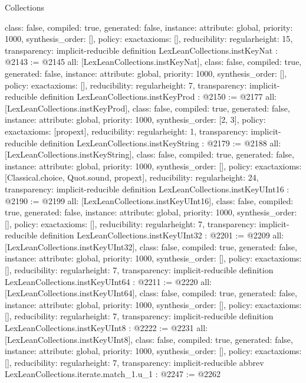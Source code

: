 \begin{lexlean}{Collections}
\begin{coremodule}
{  class: false,
  compiled: true,
  generated: false,
  instance: {attribute: global, priority: 1000, synthesis_order: []},
  policy: exact{axioms: []},
  reducibility: regular{height: 15},
  transparency: implicit-reducible
}
definition LexLeanCollections.instKeyNat : @2143 := @2145 {
  all: [LexLeanCollections.instKeyNat],
  class: false,
  compiled: true,
  generated: false,
  instance: {attribute: global, priority: 1000, synthesis_order: []},
  policy: exact{axioms: []},
  reducibility: regular{height: 7},
  transparency: implicit-reducible
}
definition LexLeanCollections.instKeyProd : @2150 := @2177 {
  all: [LexLeanCollections.instKeyProd],
  class: false,
  compiled: true,
  generated: false,
  instance: {attribute: global, priority: 1000, synthesis_order: [2, 3]},
  policy: exact{axioms: [propext]},
  reducibility: regular{height: 1},
  transparency: implicit-reducible
}
definition LexLeanCollections.instKeyString : @2179 := @2188 {
  all: [LexLeanCollections.instKeyString],
  class: false,
  compiled: true,
  generated: false,
  instance: {attribute: global, priority: 1000, synthesis_order: []},
  policy: exact{axioms: [Classical.choice, Quot.sound, propext]},
  reducibility: regular{height: 24},
  transparency: implicit-reducible
}
definition LexLeanCollections.instKeyUInt16 : @2190 := @2199 {
  all: [LexLeanCollections.instKeyUInt16],
  class: false,
  compiled: true,
  generated: false,
  instance: {attribute: global, priority: 1000, synthesis_order: []},
  policy: exact{axioms: []},
  reducibility: regular{height: 7},
  transparency: implicit-reducible
}
definition LexLeanCollections.instKeyUInt32 : @2201 := @2209 {
  all: [LexLeanCollections.instKeyUInt32],
  class: false,
  compiled: true,
  generated: false,
  instance: {attribute: global, priority: 1000, synthesis_order: []},
  policy: exact{axioms: []},
  reducibility: regular{height: 7},
  transparency: implicit-reducible
}
definition LexLeanCollections.instKeyUInt64 : @2211 := @2220 {
  all: [LexLeanCollections.instKeyUInt64],
  class: false,
  compiled: true,
  generated: false,
  instance: {attribute: global, priority: 1000, synthesis_order: []},
  policy: exact{axioms: []},
  reducibility: regular{height: 7},
  transparency: implicit-reducible
}
definition LexLeanCollections.instKeyUInt8 : @2222 := @2231 {
  all: [LexLeanCollections.instKeyUInt8],
  class: false,
  compiled: true,
  generated: false,
  instance: {attribute: global, priority: 1000, synthesis_order: []},
  policy: exact{axioms: []},
  reducibility: regular{height: 7},
  transparency: implicit-reducible
}
abbrev LexLeanCollections.iterate.match_1.{u_1} : @2247 := @2262 {
}
\end{coremodule}
\end{lexlean}

